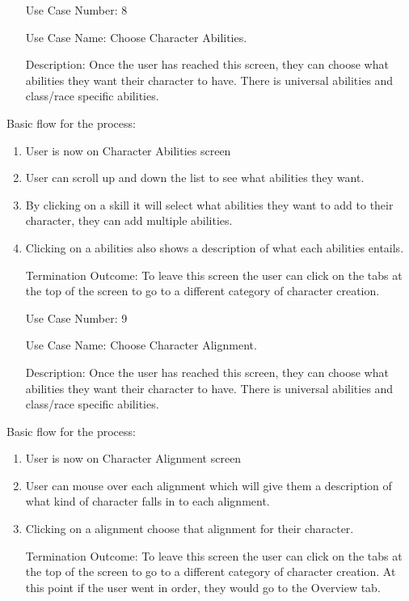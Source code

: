 \documentclass[10pt,conference,onecolumn,compsoc]{IEEEtran}
\begin{document}
\begin{itemize}
\item[Use Case Number:] 8
\item[Use Case Name:] Choose Character Abilities.
\item[Description:] Once the user has reached this screen, they can choose what abilities they want their character to have. There is universal abilities and class/race specific abilities.
\end{itemize}
Basic flow for the process:
\begin{enumerate}
\item User is now on Character Abilities screen
\item User can scroll up and down the list to see what abilities they want.
\item By clicking on a skill it will select what abilities they want to add to their character, they can add multiple abilities.
\item Clicking on a abilities also shows a description of what each abilities entails.
\item[Termination Outcome:] To leave this screen the user can click on the tabs at the top of the screen to go to a different category of character creation.
\end{enumerate}

\begin{itemize}
\item[Use Case Number:] 9
\item[Use Case Name:] Choose Character Alignment.
\item[Description:] Once the user has reached this screen, they can choose what abilities they want their character to have. There is universal abilities and class/race specific abilities.
\end{itemize}
Basic flow for the process:
\begin{enumerate}
\item User is now on Character Alignment screen
\item User can mouse over each alignment which will give them a description of what kind of character falls in to each alignment.
\item Clicking on a alignment choose that alignment for their character.
\item[Termination Outcome:] To leave this screen the user can click on the tabs at the top of the screen to go to a different category of character creation. At this point if the user went in order, they would go to the Overview tab.
\end{enumerate}
\end{document}

